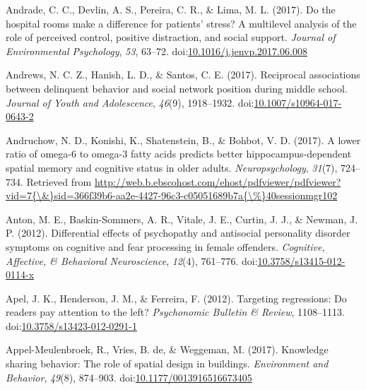 \documentclass[english,man]{apa6}
\begin{document}
\hypertarget{ref-Andrade2017}{}
Andrade, C. C., Devlin, A. S., Pereira, C. R., \& Lima, M. L. (2017). Do
the hospital rooms make a difference for patients' stress? A multilevel
analysis of the role of perceived control, positive distraction, and
social support. \emph{Journal of Environmental Psychology}, \emph{53},
63--72.
doi:\href{https://doi.org/10.1016/j.jenvp.2017.06.008}{10.1016/j.jenvp.2017.06.008}

\hypertarget{ref-Andrews2017}{}
Andrews, N. C. Z., Hanish, L. D., \& Santos, C. E. (2017). Reciprocal
associations between delinquent behavior and social network position
during middle school. \emph{Journal of Youth and Adolescence},
\emph{46}(9), 1918--1932.
doi:\href{https://doi.org/10.1007/s10964-017-0643-2}{10.1007/s10964-017-0643-2}

\hypertarget{ref-Andruchow2017}{}
Andruchow, N. D., Konishi, K., Shatenstein, B., \& Bohbot, V. D. (2017).
A lower ratio of omega-6 to omega-3 fatty acids predicts better
hippocampus-dependent spatial memory and cognitive status in older
adults. \emph{Neuropsychology}, \emph{31}(7), 724--734. Retrieved from
\href{http://web.b.ebscohost.com/ehost/pdfviewer/pdfviewer?vid=7\%7B/\&\%7Dsid=366f39b6-aa2e-4427-96c3-c05051689b7a\%7B/\%\%7D40sessionmgr102}{http://web.b.ebscohost.com/ehost/pdfviewer/pdfviewer?vid=7\{\textbackslash{}\&\}sid=366f39b6-aa2e-4427-96c3-c05051689b7a\{\textbackslash{}\%\}40sessionmgr102}

\hypertarget{ref-Anton2012}{}
Anton, M. E., Baskin-Sommers, A. R., Vitale, J. E., Curtin, J. J., \&
Newman, J. P. (2012). Differential effects of psychopathy and antisocial
personality disorder symptoms on cognitive and fear processing in female
offenders. \emph{Cognitive, Affective, \& Behavioral Neuroscience},
\emph{12}(4), 761--776.
doi:\href{https://doi.org/10.3758/s13415-012-0114-x}{10.3758/s13415-012-0114-x}

\hypertarget{ref-Apel2012}{}
Apel, J. K., Henderson, J. M., \& Ferreira, F. (2012). Targeting
regressions: Do readers pay attention to the left? \emph{Psychonomic
Bulletin \& Review}, 1108--1113.
doi:\href{https://doi.org/10.3758/s13423-012-0291-1}{10.3758/s13423-012-0291-1}

\hypertarget{ref-Appel-Meulenbroek2017}{}
Appel-Meulenbroek, R., Vries, B. de, \& Weggeman, M. (2017). Knowledge
sharing behavior: The role of spatial design in buildings.
\emph{Environment and Behavior}, \emph{49}(8), 874--903.
doi:\href{https://doi.org/10.1177/0013916516673405}{10.1177/0013916516673405}
\end{document}
